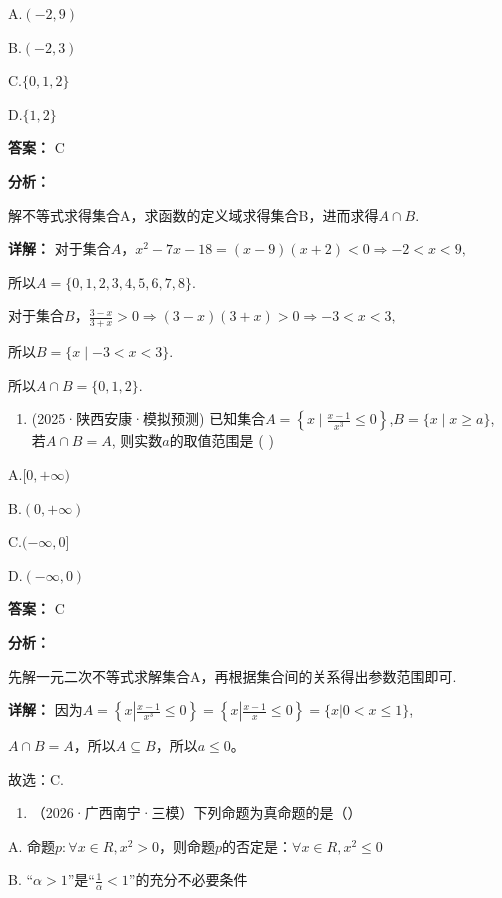 \documentclass[11pt,a4paper]{ctexart}
\begin{document}
A.\((-2,9)\)

B.\((-2,3)\)

C.\(\{0,1,2\}\)

D.\(\{1,2\}\)

\textbf{答案：}
C

\textbf{分析：}

解不等式求得集合A，求函数的定义域求得集合B，进而求得\(A \cap B\).

\textbf{详解：}
对于集合\(A\)，\(x^{2} - 7x - 18 = (x - 9)(x + 2) <   0\Rightarrow -2 <   x <   9,\)

所以\(A=\{0,1,2,3,4,5,6,7,8\}\).

对于集合\(B\)，\(\frac{3 - x}{3 + x} >0\Rightarrow (3 - x)(3 + x) > 0\Rightarrow -3 <   x <   3,\)

所以\(B=\{x\mid-3<x<3\}\).

所以\(A \cap B = \{0,1,2\}\).

\begin{enumerate}[label=\arabic*., leftmargin=*, start=2]
\item (2025·陕西安康·模拟预测)
  已知集合\(A = \left\{x \mid \frac{x - 1}{x^3} \leq 0\right\}\),\(B = \{x \mid x \geq a\}\),
  若\(A \cap B = A\), 则实数\(a\)的取值范围是 ( )
\end{enumerate}

A.\([0, +\infty)\)

B.\((0, +\infty)\)

C.\((-∞,0]\)

D.\((-∞,0)\)

\textbf{答案：}
C

\textbf{分析：}

先解一元二次不等式求解集合A，再根据集合间的关系得出参数范围即可.

\textbf{详解：}
因为\(A=\left\{x\left|\frac{x-1}{x^{3}}\leq0\right.\right\}=\left\{x\left|\frac{x-1}{x}\leq0\right.\right\}=\{x|0<x\leq1\}\),

\(A \cap B = A\)，所以\(A \subseteq B\)，所以\(a \leq 0\)。

故选：C.

\begin{enumerate}[label=\arabic*., leftmargin=*, start=3]
\item （2026·广西南宁·三模）下列命题为真命题的是（）
\end{enumerate}

A.
命题\(p: \forall x \in R, x^2 > 0\)，则命题\(p\)的否定是：\(\forall x \in R, x^2 \leq 0\)

B. ``\(\alpha > 1\)''是``\(\frac{1}{\alpha} < 1\)''的充分不必要条件
\end{document}
